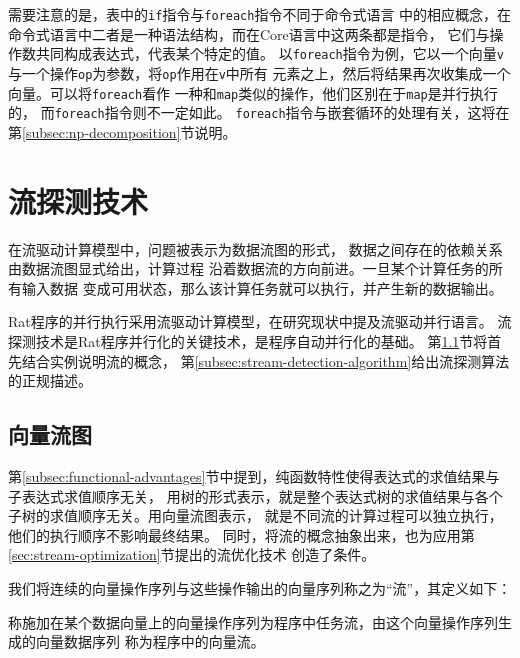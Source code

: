 需要注意的是，表中的\texttt{if}指令与\texttt{foreach}指令不同于命令式语言
中的相应概念，在命令式语言中二者是一种语法结构，而在Core语言中这两条都是指令，
它们与操作数共同构成表达式，代表某个特定的值。
以\texttt{foreach}指令为例，它以一个向量\texttt{v}
与一个操作\texttt{op}为参数，将\texttt{op}作用在\texttt{v}中所有
元素之上，然后将结果再次收集成一个向量。可以将\texttt{foreach}看作
一种和\texttt{map}类似的操作，他们区别在于\texttt{map}是并行执行的，
而\texttt{foreach}指令则不一定如此。
\texttt{foreach}指令与嵌套循环的处理有关，这将在第\ref{subsec:np-decomposition}节说明。

\section{流探测技术}\label{sec:stream-detection}
在流驱动计算模型中，问题被表示为数据流图的形式，
数据之间存在的依赖关系由数据流图显式给出，计算过程
沿着数据流的方向前进。一旦某个计算任务的所有输入数据
变成可用状态，那么该计算任务就可以执行，并产生新的数据输出。

Rat程序的并行执行采用流驱动计算模型，在研究现状中提及流驱动并行语言。
流探测技术是Rat程序并行化的关键技术，是程序自动并行化的基础。
第\ref{subsec:stream-concept}节将首先结合实例说明流的概念，
第\ref{subsec:stream-detection-algorithm}给出流探测算法的正规描述。


\subsection{向量流图}\label{subsec:stream-concept}
第\ref{subsec:functional-advantages}节中提到，纯函数特性使得表达式的求值结果与子表达式求值顺序无关，
用树的形式表示，就是整个表达式树的求值结果与各个子树的求值顺序无关。用向量流图表示，
就是不同流的计算过程可以独立执行，他们的执行顺序不影响最终结果。
同时，将流的概念抽象出来，也为应用第\ref{sec:stream-optimization}节提出的流优化技术
创造了条件。

我们将连续的向量操作序列与这些操作输出的向量序列称之为“流”，其定义如下：
\begin{definition}
  称施加在某个数据向量上的向量操作序列为程序中任务流，由这个向量操作序列生成的向量数据序列
  称为程序中的向量流。
\end{definition}

